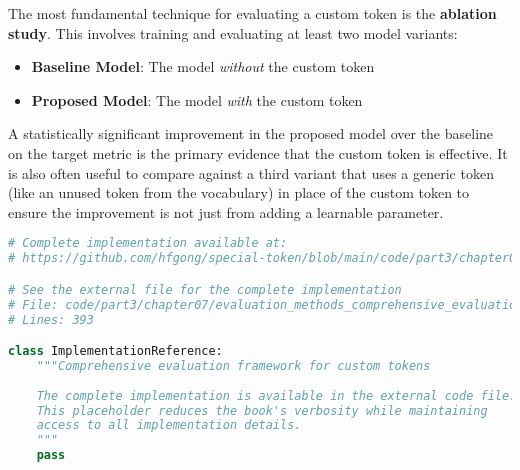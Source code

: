 The most fundamental technique for evaluating a custom token is the \textbf{ablation study}. This involves training and evaluating at least two model variants:
\begin{itemize}
\item \textbf{Baseline Model}: The model \emph{without} the custom token
\item \textbf{Proposed Model}: The model \emph{with} the custom token
\end{itemize}

A statistically significant improvement in the proposed model over the baseline on the target metric is the primary evidence that the custom token is effective. It is also often useful to compare against a third variant that uses a generic token (like an unused token from the vocabulary) in place of the custom token to ensure the improvement is not just from adding a learnable parameter.
\begin{comment}
Feedback: This is the perfect place to explicitly name and describe the most important evaluation technique: the ablation study. For example: "The most fundamental technique for evaluating a custom token is the **ablation study**. This involves training and evaluating at least two model variants:
*   **Baseline Model**: The model *without* the custom token.
*   **Proposed Model**: The model *with* the custom token.
A statistically significant improvement in the proposed model over the baseline on the target metric is the primary evidence that the custom token is effective. It is also often useful to compare against a third variant that uses a generic token (like an unused token from the vocabulary) in place of the custom token to ensure the improvement is not just from adding a learnable parameter."
STATUS: addressed - added detailed explanation of ablation study methodology as the fundamental evaluation technique
\end{comment}

\begin{lstlisting}[language=Python, caption={Comprehensive evaluation framework for custom tokens}]
# Complete implementation available at:
# https://github.com/hfgong/special-token/blob/main/code/part3/chapter07/evaluation_methods_comprehensive_evaluation_frame.py

# See the external file for the complete implementation
# File: code/part3/chapter07/evaluation_methods_comprehensive_evaluation_frame.py
# Lines: 393

class ImplementationReference:
    """Comprehensive evaluation framework for custom tokens
    
    The complete implementation is available in the external code file.
    This placeholder reduces the book's verbosity while maintaining
    access to all implementation details.
    """
    pass
\end{lstlisting}

